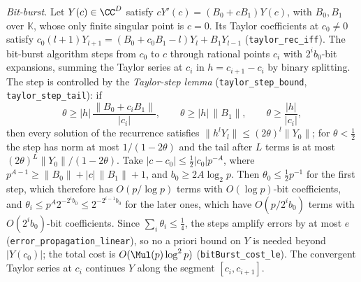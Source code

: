 \begin{small}
\emph{Bit-burst.} Let $Y(c) \in \CC^D$ satisfy $cY'(c) = (B_0 + cB_1)Y(c)$, with $B_0, B_1$ over $\mathbb K$, whose
only finite singular point is $c = 0$. Its Taylor coefficients at $c_0 \ne 0$ satisfy
$c_0(l+1)Y_{l+1} = (B_0 + c_0B_1 - l)Y_l + B_1Y_{l-1}$ (\nolinkurl{taylor_rec_iff}). The bit-burst algorithm
\cite{CC90,vdH99} steps from $c_0$ to $c$ through rational points $c_i$ with $2^ib_0$-bit expansions, summing the
Taylor series at $c_i$ in $h = c_{i+1} - c_i$ by binary splitting. The step is controlled by the \emph{Taylor-step
lemma} (\nolinkurl{taylor_step_bound}, \nolinkurl{taylor_step_tail}): if
\[
  \theta \ge |h|\,\frac{\|B_0 + c_iB_1\|}{|c_i|}, \qquad \theta \ge |h|\,\|B_1\|, \qquad \theta \ge \frac{|h|}{|c_i|},
\]
then every solution of the recurrence satisfies $\|h^lY_l\| \le (2\theta)^l\|Y_0\|$; for $\theta < \frac12$ the
step has norm at most $1/(1-2\theta)$ and the tail after $L$ terms is at most $(2\theta)^L\|Y_0\|/(1-2\theta)$.
Take $|c - c_0| \le \frac12|c_0|p^{-A}$, where $p^{A-1} \ge \|B_0\| + |c|\,\|B_1\| + 1$, and
$b_0 \ge 2A\log_2p$. Then $\theta_0 \le \frac12p^{-1}$ for the first step, which therefore has $O(p/\log p)$ terms
with $O(\log p)$-bit coefficients, and $\theta_i \le p^A2^{-2^ib_0} \le 2^{-2^{i-1}b_0}$ for the later ones, which have
$O(p/2^ib_0)$ terms with $O(2^ib_0)$-bit coefficients. Since $\sum_i\theta_i \le \frac14$, the steps amplify errors by at most $e$
(\nolinkurl{error_propagation_linear}), so no a priori bound on $Y$ is needed beyond $|Y(c_0)|$; the total cost is
$O(\Mul(p)\log^2p)$ (\nolinkurl{bitBurst_cost_le}). The convergent Taylor series at $c_i$ continues $Y$ along the
segment $[c_i, c_{i+1}]$.


\end{small}

